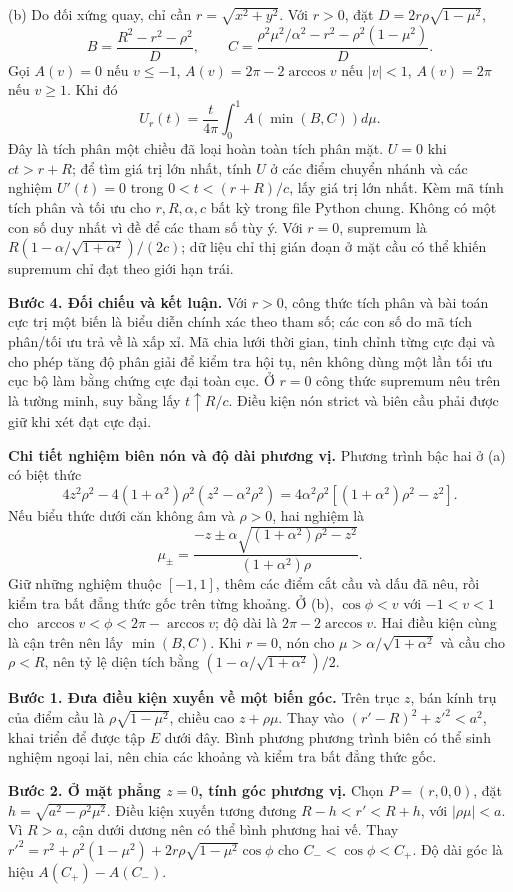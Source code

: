 (b) Do đối xứng quay, chỉ cần $r=\sqrt{x^2+y^2}$. Với $r>0$, đặt $D=2r\rho\sqrt{1-\mu^2}$,
\[B=\frac{R^2-r^2-\rho^2}{D},\qquad C=\frac{\rho^2\mu^2/\alpha^2-r^2-\rho^2(1-\mu^2)}D.\]
Gọi $A(v)=0$ nếu $v\le-1$, $A(v)=2\pi-2\arccos v$ nếu $|v|<1$, $A(v)=2\pi$ nếu $v\ge1$. Khi đó
\[U_r(t)=\frac t{4\pi}\int_0^1A(\min(B,C))d\mu.\]
Đây là tích phân một chiều đã loại hoàn toàn tích phân mặt. $U=0$ khi $ct>r+R$; để tìm giá trị lớn nhất, tính $U$ ở các điểm chuyển nhánh và các nghiệm $U'(t)=0$ trong $0<t<(r+R)/c$, lấy giá trị lớn nhất. Kèm mã tính tích phân và tối ưu cho $r,R,\alpha,c$ bất kỳ trong file Python chung. Không có một con số duy nhất vì đề để các tham số tùy ý. Với $r=0$, supremum là $R(1-\alpha/\sqrt{1+\alpha^2})/(2c)$; dữ liệu chỉ thị gián đoạn ở mặt cầu có thể khiến supremum chỉ đạt theo giới hạn trái.

\textbf{Bước 4. Đối chiếu và kết luận.} Với $r>0$, công thức tích phân và bài toán cực trị một biến là biểu diễn chính xác theo tham số; các con số do mã tích phân/tối ưu trả về là xấp xỉ. Mã chia lưới thời gian, tinh chỉnh từng cực đại và cho phép tăng độ phân giải để kiểm tra hội tụ, nên không dùng một lần tối ưu cục bộ làm bằng chứng cực đại toàn cục. Ở $r=0$ công thức supremum nêu trên là tường minh, suy bằng lấy $t\uparrow R/c$. Điều kiện nón strict và biên cầu phải được giữ khi xét đạt cực đại.

\textbf{Chi tiết nghiệm biên nón và độ dài phương vị.} Phương trình bậc hai ở (a) có biệt thức
\[4z^2\rho^2-4(1+\alpha^2)\rho^2(z^2-\alpha^2\rho^2)
=4\alpha^2\rho^2[(1+\alpha^2)\rho^2-z^2].\]
Nếu biểu thức dưới căn không âm và $\rho>0$, hai nghiệm là
\[\mu_\pm=\frac{-z\pm\alpha\sqrt{(1+\alpha^2)\rho^2-z^2}}{(1+\alpha^2)\rho}.\]
Giữ những nghiệm thuộc $[-1,1]$, thêm các điểm cắt cầu và dấu đã nêu, rồi kiểm tra bất đẳng thức gốc trên từng khoảng. Ở (b), $\cos\phi<v$ với $-1<v<1$ cho $\arccos v<\phi<2\pi-\arccos v$; độ dài là $2\pi-2\arccos v$. Hai điều kiện cùng là cận trên nên lấy $\min(B,C)$. Khi $r=0$, nón cho $\mu>\alpha/\sqrt{1+\alpha^2}$ và cầu cho $\rho<R$, nên tỷ lệ diện tích bằng $(1-\alpha/\sqrt{1+\alpha^2})/2$.

\textbf{Bước 1. Đưa điều kiện xuyến về một biến góc.} Trên trục $z$, bán kính trụ của điểm cầu là $\rho\sqrt{1-\mu^2}$, chiều cao $z+\rho\mu$. Thay vào $(r'-R)^2+z'^2<a^2$, khai triển để được tập $E$ dưới đây. Bình phương phương trình biên có thể sinh nghiệm ngoại lai, nên chia các khoảng và kiểm tra bất đẳng thức gốc.

\textbf{Bước 2. Ở mặt phẳng $z=0$, tính góc phương vị.} Chọn $P=(r,0,0)$, đặt $h=\sqrt{a^2-\rho^2\mu^2}$. Điều kiện xuyến tương đương $R-h<r'<R+h$, với $|\rho\mu|<a$. Vì $R>a$, cận dưới dương nên có thể bình phương hai vế. Thay $r'^2=r^2+\rho^2(1-\mu^2)+2r\rho\sqrt{1-\mu^2}\cos\phi$ cho $C_-<\cos\phi<C_+$. Độ dài góc là hiệu $A(C_+)-A(C_-)$.

